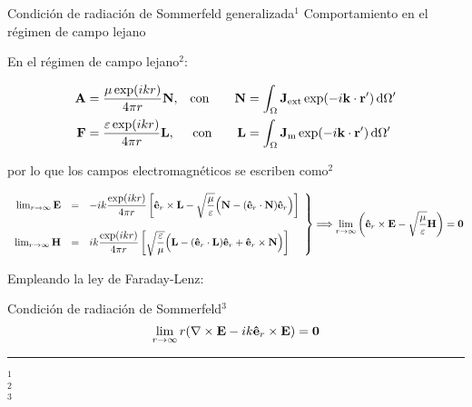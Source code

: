 \begin{frame}{Condición de radiación de Sommerfeld generalizada$^1$}
{Comportamiento en el régimen de campo lejano}\small

En el régimen de campo lejano$^2$:

\begin{align*}
    \vb{A} &= \dfrac{\mu\exp(ikr)}{4\pi r}\vb{N},         &\text{con} \qquad \vb{N} &= \int_\Omega \vb{J}_\text{ext}  \exp(-i\vb{k}\cdot\vb{r}')\dd{\Omega'}\\
    \vb{F} &= \dfrac{\varepsilon\exp(ikr)}{4\pi r}\vb{L}, &\text{con} \qquad \vb{L} &= \int_\Omega \vb{J}_\text{m}  \exp(-i\vb{k}\cdot\vb{r}')\dd{\Omega'}
\end{align*}

por lo que los campos electromagnéticos se escriben como$^2$

\begin{align*}
    \left.
    \begin{array}{rcl}
    \lim_{r\to\infty}\vb{E} &=& -i k\dfrac{\exp(ikr)}{4\pi r}
                \left[ \vu{e}_r\times\vb{L}-\sqrt{\dfrac{\mu}{\varepsilon}}  \Big(\vb{N}-(\vu{e}_r\cdot\vb{N})\vu{e}_r\Big) \right]
           \\ \\
    \lim_{r\to\infty}\vb{H} &=& i k\dfrac{\exp(ikr)}{4\pi r}
                \left[\sqrt{\dfrac{\varepsilon}{\mu}}  \Big(\vb{L}-(\vu{e}_r\cdot\vb{L})\vu{e}_r + \vu{e}_r\times\vb{N}\Big) \right]
    \end{array}
    \right\}
    \Longrightarrow\lim_{r\to\infty} \qty(\vu{e}_r\times\vb{E} - \sqrt{\dfrac{\mu}{\varepsilon}} \vb{H}) = \vb{0}
\end{align*}

Empleando la ley de Faraday-Lenz:

\begin{alertblock}{Condición de radiación de Sommerfeld$^3$}
    $$\lim_{r\to \infty} r\qty(\nabla\times \vb{E} - i k \vu{e}_r\times\vb{E}) = \vb{0}$$
\end{alertblock}%


\vspace*{-0.5em}
	\noindent\rule{.25\textwidth}{0.4pt}
 \begin{spacing}{0}\fontsize{4}{12} \selectfont
	$^1$ \\
	$^2$ \\
	$^3$ 
	\end{spacing}

\end{frame}
